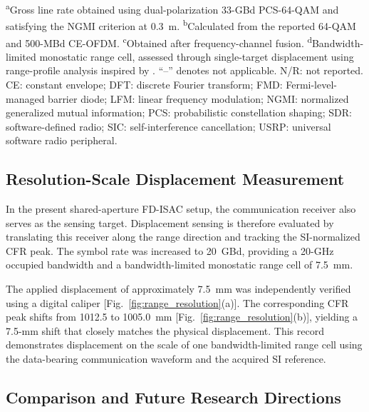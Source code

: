 \documentclass[10pt,journal]{IEEEtran}
\DeclareRobustCommand{\rev}[1]{\textcolor{revisioncolor}{#1}}
\begin{document}
\begin{table}[!t]
\vspace{1.5pt}
\parbox{\textwidth}{\scriptsize
\textsuperscript{a}Gross line rate obtained using
dual-polarization 33-GBd PCS-64-QAM and satisfying the NGMI
criterion at 0.3~m.
\textsuperscript{b}Calculated from the reported 64-QAM and
500-MBd CE-OFDM.
\textsuperscript{c}Obtained after frequency-channel fusion.
\textsuperscript{d}Bandwidth-limited monostatic range cell,
assessed through single-target displacement using range-profile
analysis inspired by \cite{lyu_multichannel_2024}.
``--'' denotes not applicable. N/R: not reported.
CE: constant envelope; DFT: discrete Fourier transform; FMD:
Fermi-level-managed barrier diode; LFM: linear frequency modulation;
NGMI: normalized generalized mutual information; PCS: probabilistic
constellation shaping; SDR: software-defined radio; SIC:
self-interference cancellation; USRP: universal software radio peripheral.
}
\end{table}

\subsection{Resolution-Scale Displacement Measurement}

In the present shared-aperture FD-ISAC setup, the communication
receiver also serves as the sensing target. Displacement sensing is
therefore evaluated by translating this receiver along the range
direction and tracking the SI-normalized CFR peak. The symbol rate
was increased to 20~GBd, providing a 20-GHz occupied bandwidth and
a bandwidth-limited monostatic range cell of 7.5~mm.

The applied displacement of approximately 7.5~mm was independently verified
using a digital caliper [Fig.~\ref{fig:range_resolution}(a)].
The corresponding CFR peak shifts from 1012.5 to 1005.0~mm
[Fig.~\ref{fig:range_resolution}(b)], yielding a 7.5-mm shift
that closely matches the physical displacement. \rev{This record demonstrates displacement on the scale of one
bandwidth-limited range cell using the data-bearing
communication waveform and the acquired SI reference.}

\subsection{Comparison and Future Research Directions}
\label{sec:discussion}
\end{document}
